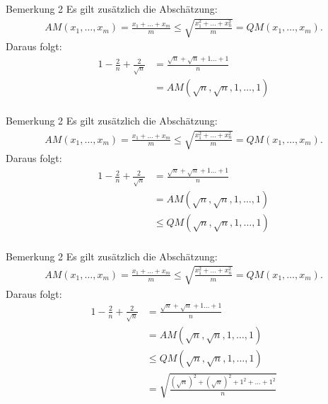 \documentclass[10pt]{beamer}
\begin{document}
\begin{frame}{Bemerkung 2}
    Es gilt zusätzlich die Abschätzung:
    \begin{align*}
        AM( x_{1}, \ldots, x_{m} )
        = \frac{x_{1} + \ldots + x_{m}}{m}
        \leq \sqrt{\frac{x_{1}^{2} + \ldots + x_{n}^{2}}{m}} 
      	= QM( x_{1}, \ldots, x_{m} ).
    \end{align*}
    Daraus folgt:
    \begin{align*}
        1 - \frac{2}{n} + \frac{2}{\sqrt{n}}
        & = \frac{\sqrt{n} + \sqrt{n} + 1 \ldots + 1}{n} \\
        & = AM(\sqrt{n}, \sqrt{n}, 1, \ldots, 1) \\
    \end{align*}
\end{frame}



\begin{frame}{Bemerkung 2}
    Es gilt zusätzlich die Abschätzung:
    \begin{align*}
        AM( x_{1}, \ldots, x_{m} )
        = \frac{x_{1} + \ldots + x_{m}}{m}
        \leq \sqrt{\frac{x_{1}^{2} + \ldots + x_{n}^{2}}{m}} 
      	= QM( x_{1}, \ldots, x_{m} ).
    \end{align*}
    Daraus folgt:
    \begin{align*}
        1 - \frac{2}{n} + \frac{2}{\sqrt{n}}
        & = \frac{\sqrt{n} + \sqrt{n} + 1 \ldots + 1}{n} \\
        & = AM(\sqrt{n}, \sqrt{n}, 1, \ldots, 1) \\
        & \leq QM(\sqrt{n}, \sqrt{n}, 1, \ldots, 1) \\
    \end{align*}
\end{frame}



\begin{frame}{Bemerkung 2}
    Es gilt zusätzlich die Abschätzung:
    \begin{align*}
        AM( x_{1}, \ldots, x_{m} )
        = \frac{x_{1} + \ldots + x_{m}}{m}
        \leq \sqrt{\frac{x_{1}^{2} + \ldots + x_{n}^{2}}{m}} 
      	= QM( x_{1}, \ldots, x_{m} ).
    \end{align*}
    Daraus folgt:
    \begin{align*}
        1 - \frac{2}{n} + \frac{2}{\sqrt{n}}
        & = \frac{\sqrt{n} + \sqrt{n} + 1 \ldots + 1}{n} \\
        & = AM(\sqrt{n}, \sqrt{n}, 1, \ldots, 1) \\
        & \leq QM(\sqrt{n}, \sqrt{n}, 1, \ldots, 1) \\
        & = \sqrt{\frac{\left( \sqrt{n} \right)^{2} + \left( \sqrt{n} \right)^{2} + 1^{2} + \ldots + 1^{2}}{n}} \\
    \end{align*}
\end{frame}
\end{document}
